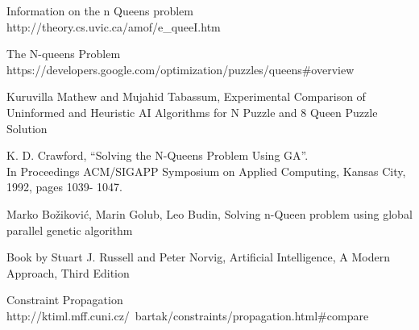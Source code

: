 \documentclass[conference]{IEEEtran}
\begin{document}
\begin{thebibliography}{11}

Information on the n Queens problem
\\http://theory.cs.uvic.ca/amof/e\_queeI.htm

The N-queens Problem
\\https://developers.google.com/optimization/puzzles/queens\#overview

Kuruvilla Mathew and Mujahid Tabassum, Experimental Comparison of Uninformed and Heuristic AI Algorithms for N Puzzle and 8 Queen Puzzle Solution 

 K. D. Crawford, “Solving the N-Queens Problem Using GA”.\\  In  Proceedings  ACM/SIGAPP  Symposium  on Applied  Computing,  Kansas  City,  1992,  pages  1039- 1047. 
 
 Marko Božiković, Marin Golub, Leo Budin, Solving n-Queen problem using  global parallel genetic algorithm

Book by Stuart J. Russell and Peter Norvig, Artificial Intelligence, A Modern Approach, Third Edition 

Constraint Propagation
\\http://ktiml.mff.cuni.cz/~bartak/constraints/propagation.html\#compare


\end{thebibliography}

\end{document}
